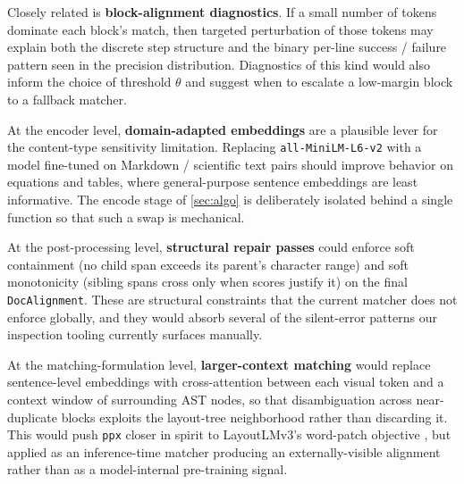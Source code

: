 \documentclass{article}
\theoremstyle{definition}
\begin{document}
Closely related is \textbf{block-alignment diagnostics}.  If a
small number of tokens dominate each block's match, then targeted
perturbation of those tokens may explain both the discrete step
structure and the binary per-line success / failure pattern seen in
the precision distribution.  Diagnostics of this kind would also
inform the choice of threshold $\theta$ and suggest when to
escalate a low-margin block to a fallback matcher.

At the encoder level, \textbf{domain-adapted embeddings} are a
plausible lever for the content-type sensitivity limitation.
Replacing \texttt{all-MiniLM-L6-v2} with a model fine-tuned on
Markdown / scientific text pairs should improve behavior on
equations and tables, where general-purpose sentence embeddings are
least informative.  The encode stage of \cref{sec:algo} is
deliberately isolated behind a single function so that such a swap
is mechanical.

At the post-processing level, \textbf{structural repair passes}
could enforce soft containment (no child span exceeds its parent's
character range) and soft monotonicity (sibling spans cross only
when scores justify it) on the final \texttt{DocAlignment}.  These
are structural constraints that the current matcher does not
enforce globally, and they would absorb several of the silent-error
patterns our inspection tooling currently surfaces manually.

At the matching-formulation level, \textbf{larger-context matching}
would replace sentence-level embeddings with cross-attention between
each visual token and a context window of surrounding AST nodes, so
that disambiguation across near-duplicate blocks exploits the
layout-tree neighborhood rather than discarding it.  This would
push \texttt{ppx} closer in spirit to LayoutLMv3's word-patch
objective \cite{huang2022layoutlmv3}, but applied as an inference-time
matcher producing an externally-visible alignment rather than as a
model-internal pre-training signal.
\end{document}
